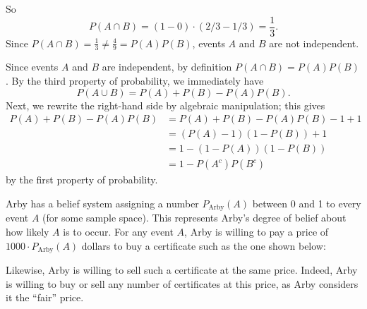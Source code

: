 {\begin{solution}
{{                So 
                \begin{equation*}
                    P(A \cap B) = (1 - 0) \cdot (2/3 - 1/3) = \frac{1}{3}. 
                \end{equation*}
                Since $P(A \cap B) = \frac{1}{3} \neq \frac{4}{9} = P(A)P(B)$, events $A$ and $B$ are not independent. 
            }
            \item 
            \begin{Proof}
                Since events $A$ and $B$ are independent, by definition $P(A \cap B) = P(A) P(B)$. 
                By the third property of probability, we immediately have 
                \begin{equation*}
                    P(A \cup B) = P(A) + P(B) - P(A)P(B). 
                \end{equation*}
                Next, we rewrite the right-hand side by algebraic manipulation; this gives 
                \begin{equation*}
                    \begin{aligned}
                    P(A) + P(B) - P(A)P(B) &= P(A) + P(B) - P(A)P(B) - 1 + 1 \\
                    &= (P(A) - 1)(1 - P(B)) + 1 \\
                    &= 1 - (1 - P(A))(1 - P(B)) \\
                    &= 1 - P(A^c)P(B^c)
                    \end{aligned}
                \end{equation*}
                by the first property of probability. 
            \end{Proof}
        }
    \end{solution}
    \item%
    \oS Arby has a belief system assigning a number $P_{\text{Arby}}(A)$ between 0 and 1 to every event $A$ (for some sample space). 
    This represents Arby's degree of belief about how likely $A$ is to occur. 
    For any event $A$, Arby is willing to pay a price of $1000 \cdot P_{\text{Arby}}(A)$ dollars to buy a certificate such as the one shown below: \\
    {\begin{center}
    \end{center}}
    Likewise, Arby is willing to sell such a certificate at the same price. 
    Indeed, Arby is willing to buy or sell any number of certificates at this price, as Arby considers it the ``fair'' price. 

}
